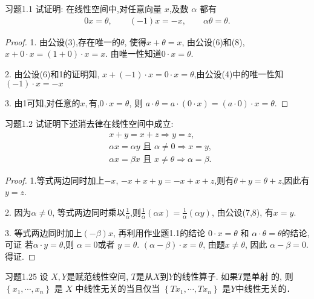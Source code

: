\documentclass[lang = cn, scheme = chinese]{elegantbook}
\begin{document}
	\begin{proposition}{习题1.1}
		试证明: 在线性空间中,对任意向量 $x$,及数 $\alpha$ 都有
		\begin{align*}
			0 x=\theta,\qquad 
			(-1) x=-x,\qquad 
			\alpha \theta=\theta .
		\end{align*}
	\end{proposition}
	
	\begin{proof}
		1. 由公设(3),存在唯一的$\theta$, 使得$x+\theta=x$, 由公设(6)和(8), $x+0\cdot x=(1+0)\cdot x =x$.
		由唯一性知道$0\cdot x= \theta$.
		
		2. 由公设(6)和1的证明知, $x+(-1)\cdot x=0\cdot x=\theta$,由公设(4)中的唯一性知
		$(-1)\cdot x=-x$
		
		3. 由1可知,对任意的$x,$有,$0\cdot x= \theta$, 则
		$
		a\cdot \theta=a\cdot( 0\cdot x)=(a\cdot 0)\cdot x=\theta.
		$
	\end{proof}
	
	\begin{proposition}{习题1.2}
		试证明下述消去律在线性空间中成立:
		\begin{align*}
			&x+y=x+z \Rightarrow y=z, \\
			&\alpha x=\alpha y \text { 且 } \alpha \neq 0 \Rightarrow x=y, \\
			&\alpha x=\beta x \text { 且 } x \neq \theta \Rightarrow \alpha=\beta .
		\end{align*}
	\end{proposition}
	
	\begin{proof}
		1.等式两边同时加上$-x$, $-x+x+y=-x+x+z$,则有$\theta+y=\theta+z$,因此有$y=z$.
		
		2. 因为$\alpha\neq 0$, 等式两边同时乘以$\frac{1}{\alpha}$,则$\frac{1}{\alpha}(\alpha x)=\frac{1}{\alpha}(\alpha y)$, 由公设(7,8), 有$x=y$.
		
		3. 等式两边同时加上$(-\beta)x$, 再利用作业题1.1的结论 $0\cdot x=\theta$ 和 $\alpha \cdot \theta =\theta$的结论,可证 若$\alpha \cdot y=\theta$,则 $\alpha=0$或者 $y=\theta$.  $(\alpha-\beta)\cdot x=\theta $, 由题$x\neq \theta $, 因此 $\alpha-\beta=0$. 得证.
	\end{proof}
	
	\begin{proposition}{习题1.25}
		设 $X, Y$是赋范线性空间, $T$是从$X$到$Y$的线性算子. 如果$T$是单射
		的, 则$\left\{x_1, \cdots, x_n\right\}$ 是 $X$ 中线性无关的当且仅当 $\left\{T x_1, \cdots, T x_n\right\}$ 是$Y$中线性无关的．
	\end{proposition}
	
\end{document}
